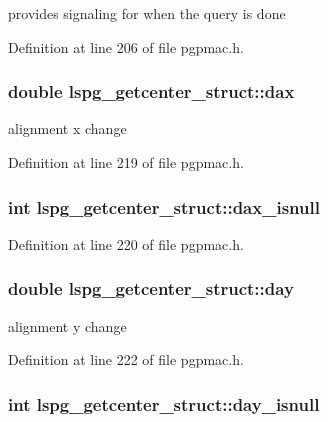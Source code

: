 provides signaling for when the query is done 



Definition at line 206 of file pgpmac.\-h.

\hypertarget{structlspg__getcenter__struct_a17db52848c28852a470222ec93ae8886}{
\subsubsection[{dax}]{\setlength{\rightskip}{0pt plus 5cm}double lspg\-\_\-getcenter\-\_\-struct\-::dax}}\label{structlspg__getcenter__struct_a17db52848c28852a470222ec93ae8886}


alignment x change 



Definition at line 219 of file pgpmac.\-h.

\hypertarget{structlspg__getcenter__struct_a621b489777d61e9db8b33b784b8d70f9}{
\subsubsection[{dax\-\_\-isnull}]{\setlength{\rightskip}{0pt plus 5cm}int lspg\-\_\-getcenter\-\_\-struct\-::dax\-\_\-isnull}}\label{structlspg__getcenter__struct_a621b489777d61e9db8b33b784b8d70f9}


Definition at line 220 of file pgpmac.\-h.

\hypertarget{structlspg__getcenter__struct_a9ce0f29540f2ff47be9788565d19f1b8}{
\subsubsection[{day}]{\setlength{\rightskip}{0pt plus 5cm}double lspg\-\_\-getcenter\-\_\-struct\-::day}}\label{structlspg__getcenter__struct_a9ce0f29540f2ff47be9788565d19f1b8}


alignment y change 



Definition at line 222 of file pgpmac.\-h.

\hypertarget{structlspg__getcenter__struct_a36f57a319288810caf365cca7827ff96}{
\subsubsection[{day\-\_\-isnull}]{\setlength{\rightskip}{0pt plus 5cm}int lspg\-\_\-getcenter\-\_\-struct\-::day\-\_\-isnull}}\label{structlspg__getcenter__struct_a36f57a319288810caf365cca7827ff96}


